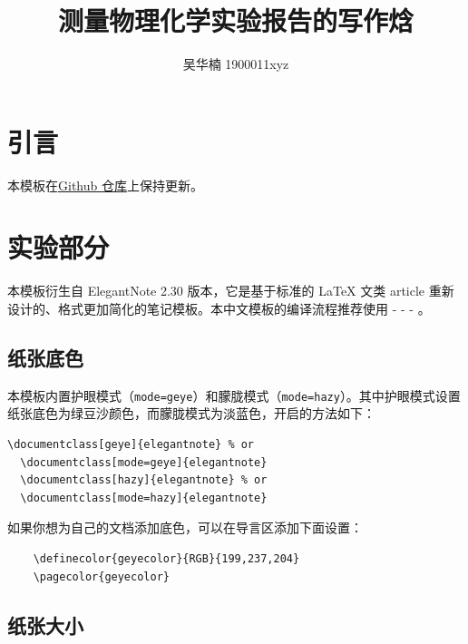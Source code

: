 \documentclass[cn,hazy,pku,12pt,normal,math=newtx,cite=super]{elegantnote}
\title{测量物理化学实验报告的写作焓}
\author{吴华楠 \quad 1900011xyz}
\institute{化学与分子工程学院}
\begin{document}
\maketitle



\newpage


\section{引言}

本模板在\href{https://github.com/Benzoin96485/PCLreport_elegant}{Github 仓库}上保持更新。

\section{实验部分}

本模板衍生自 ElegantNote 2.30 版本，它是基于标准的 \LaTeX{} 文类 article 重新设计的、格式更加简化的笔记模板。本中文模板的编译流程推荐使用  -  -  - 。

\subsection{纸张底色}

本模板内置护眼模式（\lstinline{mode=geye}）和朦胧模式（\lstinline{mode=hazy}）。其中护眼模式设置纸张底色为绿豆沙颜色，而朦胧模式为淡蓝色，开启的方法如下：
\begin{lstlisting}[frame=none]  
  \documentclass[geye]{elegantnote} % or
  \documentclass[mode=geye]{elegantnote}
  \documentclass[hazy]{elegantnote} % or
  \documentclass[mode=hazy]{elegantnote}
\end{lstlisting}

\begin{remark}
  如果你想为自己的文档添加底色，可以在导言区添加下面设置：
  \begin{lstlisting}
    \definecolor{geyecolor}{RGB}{199,237,204}
    \pagecolor{geyecolor}
  \end{lstlisting}
\end{remark}


\subsection{纸张大小}
\end{document}
